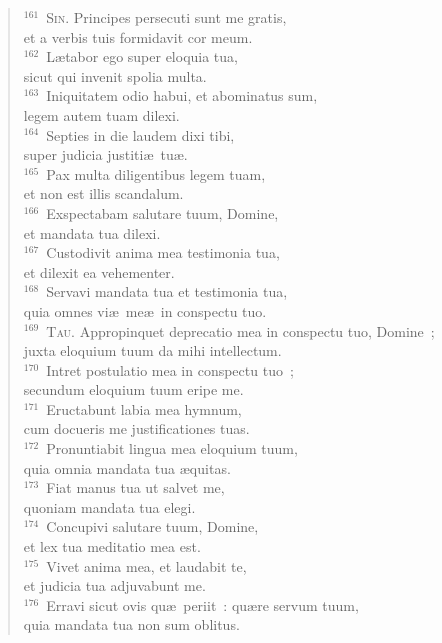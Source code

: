 \begin{flushleft}
\begin{verse}
${}^{161}$~\textsc{Sin.} Principes persecuti sunt me gratis,\\ et a verbis tuis formidavit cor meum.\\
${}^{162}$~L\ae tabor ego super eloquia tua,\\ sicut qui invenit spolia multa.\\
${}^{163}$~Iniquitatem odio habui, et abominatus sum,\\ legem autem tuam dilexi.\\
${}^{164}$~Septies in die laudem dixi tibi,\\ super judicia justiti\ae\ tu\ae .\\
${}^{165}$~Pax multa diligentibus legem tuam,\\ et non est illis scandalum.\\
${}^{166}$~Exspectabam salutare tuum, Domine,\\ et mandata tua dilexi.\\
${}^{167}$~Custodivit anima mea testimonia tua,\\ et dilexit ea vehementer.\\
${}^{168}$~Servavi mandata tua et testimonia tua,\\ quia omnes vi\ae\ me\ae\ in conspectu tuo.\\
${}^{169}$~\textsc{Tau.} Appropinquet deprecatio mea in conspectu tuo, Domine~;\\ juxta eloquium tuum da mihi intellectum.\\
${}^{170}$~Intret postulatio mea in conspectu tuo~;\\ secundum eloquium tuum eripe me.\\
${}^{171}$~Eructabunt labia mea hymnum,\\ cum docueris me justificationes tuas.\\
${}^{172}$~Pronuntiabit lingua mea eloquium tuum,\\ quia omnia mandata tua \ae quitas.\\
${}^{173}$~Fiat manus tua ut salvet me,\\ quoniam mandata tua elegi.\\
${}^{174}$~Concupivi salutare tuum, Domine,\\ et lex tua meditatio mea est.\\
${}^{175}$~Vivet anima mea, et laudabit te,\\ et judicia tua adjuvabunt me.\\
${}^{176}$~Erravi sicut ovis qu\ae\ periit~: qu\ae re servum tuum,\\ quia mandata tua non sum oblitus.\end{verse}\end{flushleft}




